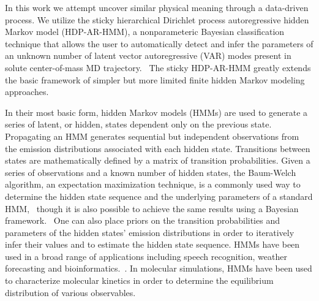 \documentclass[journal=jpcbfk,manuscript=article]{achemso}
\begin{document}
  In this work we attempt 
  uncover similar physical meaning through a data-driven process. 
  We utilize the sticky hierarchical Dirichlet process autoregressive hidden Markov model 
  (HDP-AR-HMM), a nonparameteric Bayesian classification technique that allows the user to 
  automatically detect and infer the parameters of an unknown number of latent vector
  autoregressive (VAR) modes present in solute center-of-mass MD 
  trajectory.~\cite{fox_bayesian_2010} The sticky HDP-AR-HMM greatly extends the 
  basic framework of simpler but more limited finite hidden Markov modeling approaches.
    
  In their most basic form, hidden Markov models (HMMs) are used to generate
  a series of latent, or hidden, states dependent only on the previous state.~\cite{rabiner_tutorial_1989}
  Propagating an HMM generates sequential but independent observations from 
  the emission distributions associated with each hidden state. Transitions 
  between states are mathematically defined by a matrix of transition probabilities.
  Given a series of observations and a known number of hidden states, the 
  Baum-Welch algorithm, an expectation maximization technique, is a commonly 
  used way to determine the hidden state sequence and the underlying parameters of
  a standard HMM,~\cite{baum_maximization_1970} though it is also possible to achieve the same
  results using a Bayesian framework.~\cite{scott_bayesian_2002,jasra_markov_2005} 
  One can also place priors on the transition probabilities and parameters of the hidden 
  states' emission distributions in order to iteratively infer their values and to
  estimate the hidden state sequence. HMMs have been used in a broad range of applications
  including speech recognition, weather forecasting and bioinformatics.~\cite{juang_hidden_1984,hughes_non-homogeneous_1999,yoon_hidden_2009}.
  In molecular simulations, HMMs have been used to characterize molecular kinetics
  in order to determine the equilibrium distribution of various observables.~\cite{thayer_hidden_2002,singhal_using_2004,noe_probability_2008,noe_projected_2013}
  
\end{document}
